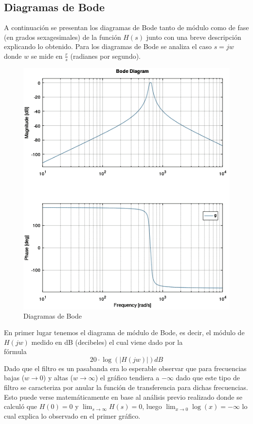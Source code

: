 \documentclass[11pt,a4paper]{report}
\begin{document}
\subsection*{Diagramas de Bode}

A continuación se presentan los diagramas de Bode tanto de módulo como de fase (en grados sexagesimales) de la función $H(s)$ junto con una breve descripción explicando
lo obtenido. Para los diagramas de Bode se analiza el caso $s=jw$ donde $w$ se mide
en $\frac{r}{s}$ (radianes por segundo).

\begin{figure}[h!]
\includegraphics[scale=0.7]{DiagramasBode.png}
\caption{Diagramas de Bode}
\end{figure}

\newpage
En primer lugar tenemos el diagrama de módulo de Bode, es decir, el módulo de 
$H(jw)$ medido en dB (decibeles) el cual viene dado por la\\ fórmula
\[20 \cdot \log(|H(jw)|) dB\]
Dado que el filtro es un pasabanda era lo esperable
observar que para frecuencias bajas ($w\longrightarrow0$) y altas ($w\longrightarrow\infty$) el gráfico tendiera a $-\infty$ dado que este tipo de
filtro se caracteriza por anular la función de transferencia para dichas frecuencias.
Esto puede verse matemáticamente en base al análisis previo realizado donde se calculó que $H(0) = 0$ y $\lim_{s \to \infty} H(s) = 0$, luego 
$\lim_{x \to 0} \log(x) = -\infty$ lo cual explica lo observado en el primer gráfico.
\end{document}
